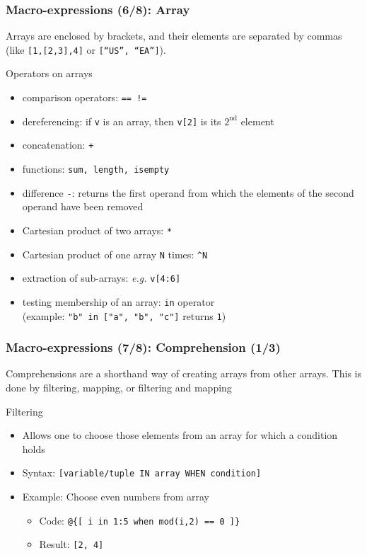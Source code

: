 \documentclass{beamer}
\begin{document}
\begin{frame}[fragile=singleslide]
  \frametitle{Macro-expressions (6/8): Array}
  Arrays are enclosed by brackets, and their elements are separated by commas
  (like \texttt{[1,[2,3],4]} or \texttt{[``US'', ``EA'']}).
  \begin{block}{Operators on arrays}
    \begin{itemize}
    \item comparison operators: \texttt{== !=}
    \item dereferencing: if \texttt{v} is an array, then \texttt{v[2]} is its $2^{\textrm{nd}}$ element
    \item concatenation: \texttt{+}
    \item functions: \texttt{sum, length, isempty}
    \item difference \texttt{-}: returns the first operand from which the elements of the second operand have been removed
    \item Cartesian product of two arrays: \texttt{*}
    \item Cartesian product of one array \texttt{N} times: \texttt{\^{}N}
    \item extraction of sub-arrays: \textit{e.g.} \texttt{v[4:6]}
    \item testing membership of an array: \texttt{in} operator \\ (example:
      \texttt{"b" in ["a", "b", "c"]} returns \texttt{1})
    \end{itemize}
  \end{block}
\end{frame}

\begin{frame}[fragile=singleslide]
  \frametitle{Macro-expressions (7/8): Comprehension (1/3)}
  Comprehensions are a shorthand way of creating arrays from other arrays. This is done by filtering, mapping, or filtering and mapping
  \begin{block}{Filtering}
    \begin{itemize}
    \item Allows one to choose those elements from an array for which a condition holds
    \item Syntax: \texttt{[variable/tuple IN array WHEN condition]}
    \item Example: Choose even numbers from array
      \begin{itemize}
      \item Code: \texttt{@\{[ i in 1:5 when mod(i,2) == 0 ]\}}
      \item Result: \texttt{[2, 4]}
      \end{itemize}
    \end{itemize}
  \end{block}
\end{frame}
\end{document}
